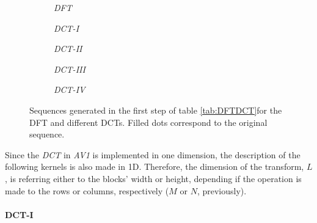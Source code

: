 \begin{figure}[h]
    \centering 
        \begin{subfigure}[c]{\textwidth}
            \centering
            
            \caption{\emph{DFT}}
            \label{subfig:dft}
        \end{subfigure}
        \begin{subfigure}[c]{0.45\textwidth}
            \centering
            
            \caption{\emph{DCT-I}}
            \label{subfig:dct1}
        \end{subfigure}
        \begin{subfigure}[c]{0.45\textwidth}
            \centering
            
            \caption{\emph{DCT-II}}
            \label{subfig:dct2}
        \end{subfigure}
        \begin{subfigure}[c]{0.45\textwidth}
            \centering
            
            \caption{\emph{DCT-III}}
            \label{subfig:dct3}
        \end{subfigure}
        \begin{subfigure}[c]{0.45\textwidth}
            \centering
            
            \caption{\emph{DCT-IV}}
            \label{subfig:dct4}
        \end{subfigure}
        \caption{Sequences generated in the first step of table \ref{tab:DFTDCT}for the DFT and different DCTs. Filled dots correspond to the original sequence.}
    \label{fig:2NSeq}
\end{figure}


Since the \emph{DCT} in \emph{AV1} is implemented in one dimension, the description of the following kernels is also made in 1D. Therefore, the dimension of the transform, $L$, is referring either to the blocks' width or height, depending if the operation is made to the rows or columns, respectively ($M$ or $N$, previously).

\paragraph{DCT-I}

